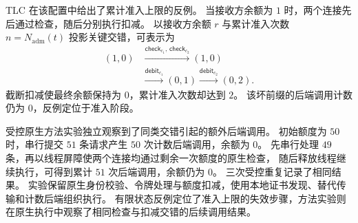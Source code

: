 TLC 在该配置中给出了累计准入上限的反例。
当接收方余额为 $1$ 时，两个连接先后通过检查，随后分别执行扣减。
以接收方余额 $r$ 与累计准入次数 $n=N_{\mathrm{adm}}(t)$ 投影关键交错，可表示为
\begin{equation}
  \begin{aligned}
    (1,0)&\xrightarrow{\mathsf{check}_{c_1},\,\mathsf{check}_{c_2}}(1,0)\\
         &\xrightarrow{\mathsf{debit}_{c_1}}(0,1)
          \xrightarrow{\mathsf{debit}_{c_2}}(0,2).
  \end{aligned}
  \label{eq:act-last-credit-interleaving}
\end{equation}
截断扣减使最终余额保持为 $0$，累计准入次数却达到 $2$。
该坏前缀的后端调用计数仍为 $0$，反例定位于准入阶段。

受控原生方法实验独立观察到了同类交错引起的额外后端调用。
初始额度为 $50$ 时，串行提交 $51$ 条请求产生 $50$ 次计数后端调用，余额为 $0$。
先串行处理 $49$ 条，再以线程屏障使两个连接均通过剩余一次额度的原生检查，
随后释放线程继续执行，可得到累计 $51$ 次后端调用，余额仍为 $0$。
三次受控重复记录了相同结果。
实验保留原生身份校验、令牌处理与额度扣减，使用本地证书发现、替代传输和计数后端组织执行。
有限状态反例定位了准入上限的失效步骤，方法实验则在原生执行中观察了相同检查与扣减交错的后续调用结果。
